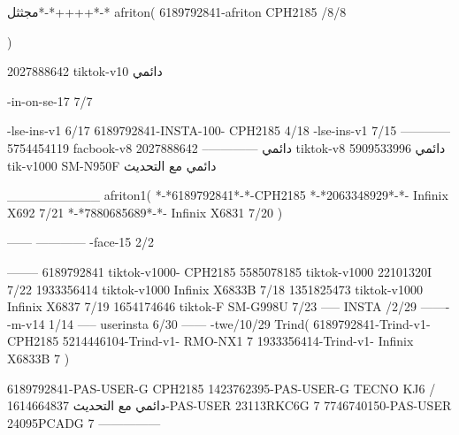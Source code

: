 مجثثل*-*++++*-*
afriton(
6189792841-afriton CPH2185  /8/8

)

2027888642 tiktok-v10
دائمي

-in-on-se-17 7/7

-lse-ins-v1 6/17
6189792841-INSTA-100- CPH2185 4/18
-lse-ins-v1 7/15
------------
5754454119 facbook-v8
دائمي
--------------
2027888642 tiktok-v8
دائمي
5909533996 tik-v1000  SM-N950F
دائمي مع التحديث

__________
afriton1(
*-*6189792841*-*-CPH2185
*-*2063348929*-*-  Infinix X692  7/21
*-*7880685689*-*-   Infinix X6831  7/20
)


------
------------
-face-15 2/2

--------
6189792841 tiktok-v1000- CPH2185 
5585078185 tiktok-v1000 22101320I  7/22
1933356414 tiktok-v1000 Infinix X6833B  7/18
1351825473 tiktok-v1000 Infinix X6837  7/19
1654174646 tiktok-F SM-G998U  7/23
-----
 INSTA /2/29
-------
-m-v14 1/14
-----
userinsta 6/30
------
-twe/10/29
Trind(
6189792841-Trind-v1- CPH2185 
5214446104-Trind-v1- RMO-NX1 7
1933356414-Trind-v1- Infinix X6833B 7
)


6189792841-PAS-USER-G CPH2185 
1423762395-PAS-USER-G TECNO KJ6  /دائمي مع التحديث
1614664837-PAS-USER 23113RKC6G 7
7746740150-PAS-USER 24095PCADG 7
    ---------------
